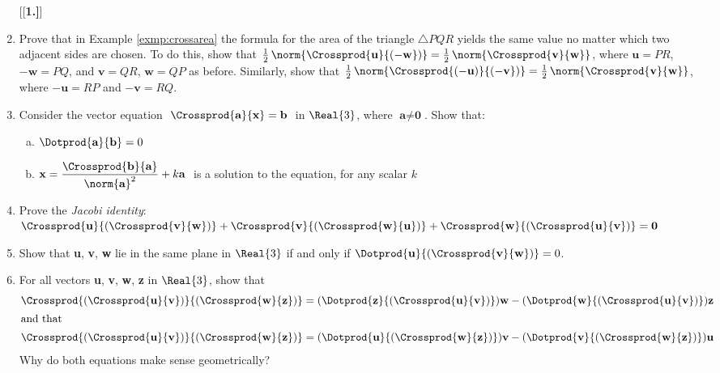 \begin{enumerate}[\bfseries 1.]
[{[\bfseries 1.]}]
 \item Prove that in Example \ref{exmp:crossarea} the formula for the area of the triangle $\triangle PQR$ yields the
  same value no matter which two adjacent sides are chosen. To do this, show that
  $\frac{1}{2}\,\norm{\Crossprod{\textbf{u}}{(-\textbf{w}})} = \frac{1}{2}\,\norm{\Crossprod{\textbf{v}}{\textbf{w}}}$,
  where $\textbf{u} = PR$, $-\textbf{w} = PQ$, and $\textbf{v} = QR$, $\textbf{w} = QP$ as before. Similarly, show that
  $\frac{1}{2}\,\norm{\Crossprod{(-\textbf{u})}{(-\textbf{v}})} =
  \frac{1}{2}\,\norm{\Crossprod{\textbf{v}}{\textbf{w}}}$, where $-\textbf{u} = RP$ and $-\textbf{v} = RQ$.
 \item Consider the vector equation $\thickspace\Crossprod{\textbf{a}}{\textbf{x}} = \textbf{b}\thickspace$
  in $\Real{3}$, where $\textbf{a} \ne \textbf{0}$. Show that:
  \begin{enumerate}[(a)]
   \item $\Dotprod{\textbf{a}}{\textbf{b}} = 0$
   \item $\textbf{x} = \dfrac{\Crossprod{\textbf{b}}{\textbf{a}}}{\norm{\textbf{a}}^2} + k \textbf{a}\thickspace$
   is a solution to the equation, for any scalar $k$
  \end{enumerate}
 \item Prove the \emph{Jacobi identity}:
  $\Crossprod{\textbf{u}}{(\Crossprod{\textbf{v}}{\textbf{w}})} +
  \Crossprod{\textbf{v}}{(\Crossprod{\textbf{w}}{\textbf{u}})} +
  \Crossprod{\textbf{w}}{(\Crossprod{\textbf{u}}{\textbf{v}})} = \textbf{0}$
 \item Show that \textbf{u}, \textbf{v}, \textbf{w} lie in the same plane in $\Real{3}$ if and only if
  $\Dotprod{\textbf{u}}{(\Crossprod{\textbf{v}}{\textbf{w}})} = 0$.
 \item For all vectors \textbf{u}, \textbf{v}, \textbf{w}, \textbf{z} in $\Real{3}$, show that
  \begin{align*}
   \Crossprod{(\Crossprod{\textbf{u}}{\textbf{v}})}{(\Crossprod{\textbf{w}}{\textbf{z}})} &=
    (\Dotprod{\textbf{z}}{(\Crossprod{\textbf{u}}{\textbf{v}})})\textbf{w} -
    (\Dotprod{\textbf{w}}{(\Crossprod{\textbf{u}}{\textbf{v}})})\textbf{z}\\
   \intertext{and that}
   \Crossprod{(\Crossprod{\textbf{u}}{\textbf{v}})}{(\Crossprod{\textbf{w}}{\textbf{z}})} &=
    (\Dotprod{\textbf{u}}{(\Crossprod{\textbf{w}}{\textbf{z}})})\textbf{v} -
    (\Dotprod{\textbf{v}}{(\Crossprod{\textbf{w}}{\textbf{z}})})\textbf{u}
  \end{align*}
  Why do both equations make sense geometrically?
\end{enumerate}
\newpage
